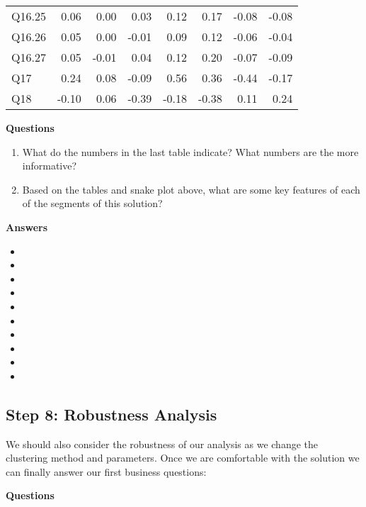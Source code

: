 \documentclass[
]{article}
\providecommand{\tightlist}{%
  \setlength{\itemsep}{0pt}\setlength{\parskip}{0pt}}
\begin{document}
\begin{center}
\begin{longtable}{lrrrrrrr}
Q16.25 & 0.06 & 0.00 & 0.03 & 0.12 & 0.17 & -0.08 & -0.08\\
Q16.26 & 0.05 & 0.00 & -0.01 & 0.09 & 0.12 & -0.06 & -0.04\\
Q16.27 & 0.05 & -0.01 & 0.04 & 0.12 & 0.20 & -0.07 & -0.09\\
Q17 & 0.24 & 0.08 & -0.09 & 0.56 & 0.36 & -0.44 & -0.17\\
\addlinespace
Q18 & -0.10 & 0.06 & -0.39 & -0.18 & -0.38 & 0.11 & 0.24\\
\bottomrule
\end{longtable}\end{center}

\textbf{Questions}

\begin{enumerate}
\def\labelenumi{\arabic{enumi}.}
\tightlist
\item
  What do the numbers in the last table indicate? What numbers are the
  more informative?
\item
  Based on the tables and snake plot above, what are some key features
  of each of the segments of this solution?
\end{enumerate}

\textbf{Answers}

\begin{itemize}
\tightlist
\item
\item
\item
\item
\item
\item
\item
\item
\item
\item
\end{itemize}

\hypertarget{step-8-robustness-analysis}{%
\subsection{Step 8: Robustness
Analysis}\label{step-8-robustness-analysis}}

We should also consider the robustness of our analysis as we change the
clustering method and parameters. Once we are comfortable with the
solution we can finally answer our first business questions:

\textbf{Questions}
\end{document}
